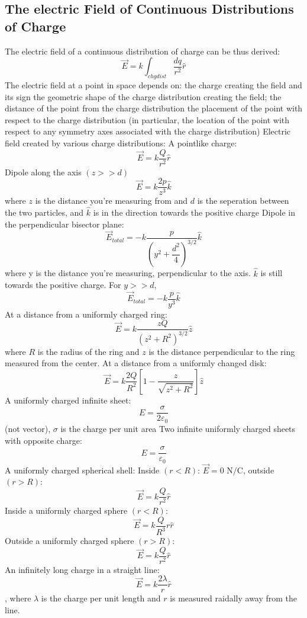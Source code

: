 \documentclass[twocolumn]{article}
\begin{document}
\subsection{The electric Field of Continuous Distributions of Charge}
\begin{outline}
	\1 The electric field of a continuous distribution of charge can be thus derived: \[\vec{E}=k\int_{chg dist}\dfrac{dq}{r^2}\hat r\]
	\1 The electric field at a point in space depends on: 
		\2 the charge creating the field and its sign 
		\2 the geometric shape of the charge distribution creating the field;
		\2 the distance of the point from the charge distribution
		\2 the placement of the point with respect to the charge distribution (in particular, the location of the point with respect to any symmetry axes associated with the charge distribution)
	\1 Electric field created by various charge distributions: 
		\2 A pointlike charge: \[\vec{E}=k\dfrac{Q}{r^2}\hat r\]
		\2 Dipole along the axis \((z>>d)\) \[\vec{E}=k\dfrac{2p}{z^3}\hat k\] where $z$ is the distance you're measuring from and $d$ is the seperation between the two particles, and $\hat k$ is in the direction towards the positive charge 
		\2 Dipole in the perpendicular bisector plane: \[\vec{E}_{total}=-k\dfrac{p}{\left(y^2+\dfrac{d^2}{4}\right)^{3/2}}\hat k\] where y is the distance you're measuring, perpendicular to the axis. $\hat k$ is still towards the positive charge. For \(y>>d\), \[\vec{E}_{total}=-k\dfrac{p}{y^3}\hat k\]
		\2 At a distance from a uniformly charged ring: \[\vec{E}=k\dfrac{zQ}{(z^2+R^2)^{3/2}}\hat z\] where $R$ is the radius of the ring and $z$ is the distance perpendicular to the ring measured from the center. 
		\2 At a distance from a uniformly changed disk: \[\vec{E}=k\dfrac{2Q}{R^2}\left[1-\dfrac{z}{\sqrt{z^2+R^2}}\right]\hat z\]
		\2 A uniformly charged infinite sheet: \[E=\dfrac{\sigma}{2\varepsilon_0}\] (not vector), $\sigma$ is the charge per unit area 
		\2 Two infinite uniformly charged sheets with opposite charge: \[E=\dfrac{\sigma}{\varepsilon_0}\]
		\2 A uniformly charged spherical shell: Inside \((r<R)\): \(\vec{E}=0\text{ N/C}\), outside \((r>R)\): \[\vec{E}=k\dfrac{Q}{r^2}\hat r\]
		\2 Inside a uniformly charged sphere \((r<R)\): \[\vec{E}=k\dfrac{Q}{R^3}r\hat r\]
		\2 Outside a uniformly charged sphere \((r>R)\): \[\vec{E}=k\dfrac{Q}{r^2}\hat r\]
		\2 An infinitely long charge in a straight line: \[\vec{E}=k\dfrac{2\lambda}{r}\hat r\], where $\lambda$ is the charge per unit length and $r$ is measured raidally away from the line. 

\end{outline}
\end{document}

